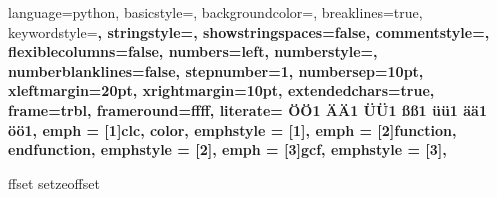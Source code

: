 {
  language=python,	%
  basicstyle=\scriptsize\ttfamily,	%
  backgroundcolor=\color{white},		%
  breaklines=true,	%
  keywordstyle=\bfseries\ttfamily\color{blue},	%
  stringstyle=\ttfamily\color{ees_yellow},			%
  showstringspaces=false,	%
  commentstyle=\color{ees_green}\ttfamily,	%
  flexiblecolumns=false,	%
  numbers=left,		%
  numberstyle=\tiny,	%
  numberblanklines=false,		%
  stepnumber=1,		%
  numbersep=10pt,		%
  xleftmargin=20pt,	%
  xrightmargin=10pt,	%
  extendedchars=true,	%
  frame=trbl,			%
  frameround=ffff,	%
  literate=		%
   {Ö}{{\"O}}1 
   {Ä}{{\"A}}1 
   {Ü}{{\"U}}1 
   {ß}{{\ss}}1 
   {ü}{{\"u}}1 
   {ä}{{\"a}}1 
   {ö}{{\"o}}1,
  emph = [1]{clc, color},
  emphstyle = [1]{\color{blue}},
  emph = [2]{function, endfunction},
  emphstyle = [2]{\color{ees_red}},
  emph = [3]{gcf},
  emphstyle = [3]{\color{black}},
}

\newcommand{\einstellung}[1]{%
  \expandafter\newcommand\csname #1\endcsname{}
  \expandafter\newcommand\csname setze#1\endcsname[1]{\expandafter\renewcommand\csname#1\endcsname{##1}}
}
\newcommand{\langstr}[1]{\einstellung{lang#1}}
\einstellung{offset}
\setzeoffset{100mm}

\makeatletter
\newlength\origparskip


\newcommand{\fquote}{%
  \@ifnextchar[{\fquote@i}{\fquote@i[]}%
}

